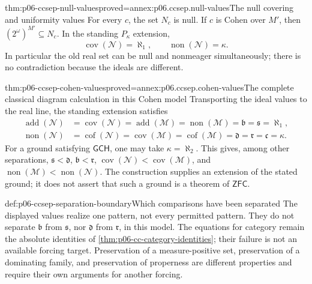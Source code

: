 \begin{hblemma}{thm:p06-ccsep-null-values}{proved=annex:p06.ccsep.null-values}{The null covering and uniformity values}
For every \(c\), the set \(N_c\) is null. If \(c\) is Cohen over
\(M'\), then \((2^\omega)^{M'}\subseteq N_c\).
In the standing \(P_\kappa\) extension,
\[
 \operatorname{cov}(\mathcal N)=\aleph_1,
 \qquad \operatorname{non}(\mathcal N)=\kappa.
\]
In particular the old real set can be null and nonmeager simultaneously;
there is no contradiction because the ideals are different.
\end{hblemma}

\begin{hbtheorem}{thm:p06-ccsep-cohen-values}{proved=annex:p06.ccsep.cohen-values}{The complete classical diagram calculation in this Cohen model}
Transporting the ideal values to the real line, the standing extension
satisfies
\[
\begin{aligned}
 \operatorname{add}(\mathcal N)
 &=\operatorname{cov}(\mathcal N)
 =\operatorname{add}(\mathcal M)
 =\operatorname{non}(\mathcal M)
 =\mathfrak b=\mathfrak s=\aleph_1,\\
 \operatorname{non}(\mathcal N)
 &=\operatorname{cof}(\mathcal N)
 =\operatorname{cov}(\mathcal M)
 =\operatorname{cof}(\mathcal M)
 =\mathfrak d=\mathfrak r=\mathfrak c=\kappa.
\end{aligned}
\]
For a ground satisfying \(\mathsf{GCH}\), one may take
\(\kappa=\aleph_2\). This gives, among other separations,
\(\mathfrak s<\mathfrak d\), \(\mathfrak b<\mathfrak r\),
\(\operatorname{cov}(\mathcal N)<\operatorname{cov}(\mathcal M)\),
and \(\operatorname{non}(\mathcal M)<\operatorname{non}(\mathcal N)\).
The construction supplies an extension of the stated ground; it does
not assert that such a ground is a theorem of \(\mathsf{ZFC}\).
\end{hbtheorem}

\begin{hbwarning}{def:p06-ccsep-separation-boundary}{Which comparisons have been separated}
The displayed values realize one pattern, not every permitted pattern.
They do not separate \(\mathfrak b\) from \(\mathfrak s\), nor
\(\mathfrak d\) from \(\mathfrak r\), in this model. The equations
for category remain the absolute identities of
\cref{thm:p06-cc-category-identities}; their failure is not an available
forcing target. Preservation of a measure-positive set, preservation
of a dominating family, and preservation of properness are different
properties and require their own arguments for another forcing.
\end{hbwarning}
